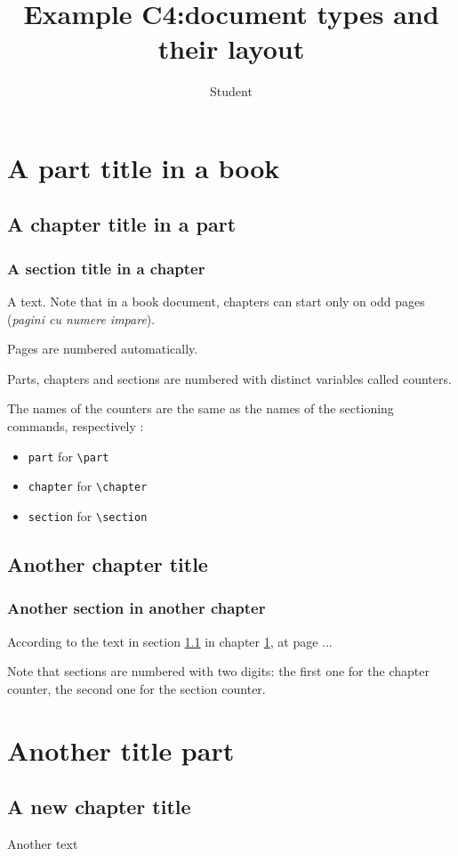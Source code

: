 \documentclass{book}
\title{Example C4:document types and their layout }
\author{Student}
\begin{document}
\maketitle
\tableofcontents
\part{A part title in a book}
\chapter{A chapter title in a part}\label{cha:et}
\section{A section title in a chapter}\label{sec:et}
A text. Note that in a book document, chapters can start only on odd pages (\emph{pagini cu numere impare}).\par
Pages are numbered automatically.\par
Parts, chapters and sections are numbered with distinct variables called counters.\par
The names of the counters are the same as the names of the sectioning commands, respectively :
\begin{itemize}
\item \verb+part+ for \verb+\part+
\item \verb+chapter+ for \verb+\chapter+
\item \verb+section+ for \verb+\section+
\end{itemize}
\chapter{Another chapter title}
\section{Another section in another chapter}
According to the text in section \ref{sec:et} in chapter \ref{cha:et}, at page \pageref{cha:et} ...\par
Note that sections are numbered with two digits: the first one for the chapter counter, the second one for the section counter.
\part{Another title part}
\chapter{A new chapter title}
Another text
\end{document}
